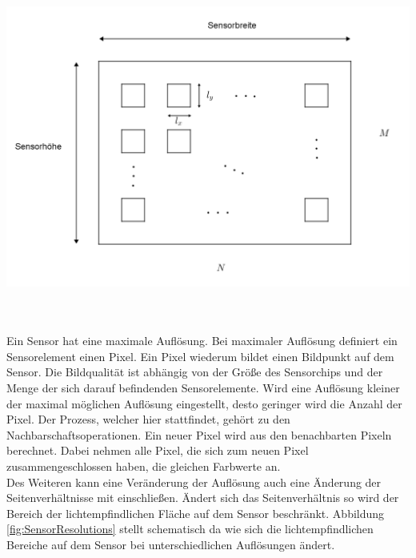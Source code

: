\begin{minipage}{\linewidth}
	\centering
	\includegraphics[width=.8\linewidth]{images/Bildsensor_mit_Pixel.png}
	\label{fig:Sensor}
\end{minipage}\\ \\


Ein Sensor hat eine maximale Auflösung. Bei maximaler Auflösung definiert ein Sensorelement einen Pixel. Ein Pixel wiederum bildet einen Bildpunkt auf dem Sensor\cite{Photonik}. Die Bildqualität ist abhängig von der Größe des Sensorchips und der Menge der sich darauf befindenden Sensorelemente. Wird eine Auflösung kleiner der maximal möglichen Auflösung eingestellt, desto geringer wird die Anzahl der Pixel. Der Prozess, welcher hier stattfindet, gehört zu den Nachbarschaftsoperationen\cite{Photonik}. Ein neuer Pixel wird aus den benachbarten Pixeln berechnet. Dabei nehmen alle Pixel, die sich zum neuen Pixel zusammengeschlossen haben, die gleichen Farbwerte an. \\

Des Weiteren kann eine Veränderung der Auflösung auch eine Änderung der Seitenverhältnisse mit einschließen. Ändert sich das Seitenverhältnis so wird der Bereich der lichtempfindlichen Fläche auf dem Sensor beschränkt\cite{Photonik}. Abbildung \ref{fig:SensorResolutions} stellt schematisch da wie sich die lichtempfindlichen Bereiche auf dem Sensor bei unterschiedlichen Auflösungen ändert.


